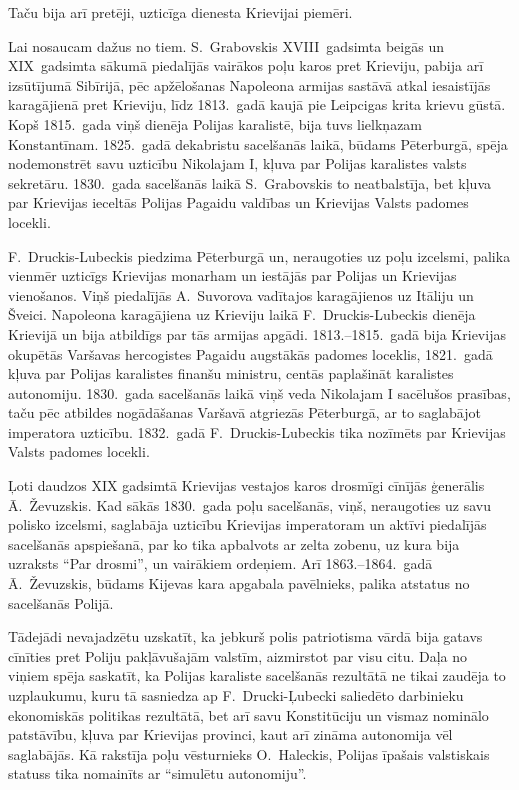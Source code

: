 \documentclass[twoside,a5paper,12pt,fleqn,openany]{extbook}
\begin{document}
Taču bija arī pretēji, uzticīga dienesta Krievijai piemēri.

Lai nosaucam dažus no tiem. S.~Grabovskis XVIII~gadsimta beigās un XIX~gadsimta sākumā piedalījās vairākos poļu karos pret Krieviju, pabija arī izsūtījumā Sibīrijā, pēc apžēlošanas Napoleona armijas sastāvā atkal iesaistījās karagājienā pret Krieviju, līdz 1813.~gadā kaujā pie Leipcigas krita krievu gūstā. Kopš 1815.~gada viņš dienēja Polijas karalistē, bija tuvs lielkņazam Konstantīnam. 1825.~gadā dekabristu sacelšanās laikā, būdams Pēterburgā, spēja nodemonstrēt savu uzticību Nikolajam I, kļuva par Polijas karalistes valsts sekretāru. 1830.~gada sacelšanās laikā S.~Grabovskis to neatbalstīja, bet kļuva par Krievijas ieceltās Polijas Pagaidu valdības un Krievijas Valsts padomes locekli.

F.~Druckis-Lubeckis piedzima Pēterburgā un, neraugoties uz poļu izcelsmi, palika vienmēr uzticīgs Krievijas monarham un iestājās par Polijas un Krievijas vienošanos. Viņš piedalījās A.~Suvorova vadītajos karagājienos uz Itāliju un Šveici. Napoleona karagājiena uz Krieviju laikā F.~Druckis-Lubeckis dienēja Krievijā un bija atbildīgs par tās armijas apgādi. 1813.--1815.~gadā bija Krievijas okupētās Varšavas hercogistes Pagaidu augstākās padomes loceklis, 1821.~gadā kļuva par Polijas karalistes finanšu ministru, centās paplašināt karalistes autonomiju. 1830.~gada sacelšanās laikā viņš veda Nikolajam I sacēlušos prasības, taču pēc atbildes nogādāšanas Varšavā atgriezās Pēterburgā, ar to saglabājot imperatora uzticību. 1832.~gadā F.~Druckis-Lubeckis tika nozīmēts par Krievijas Valsts padomes locekli.

Ļoti daudzos XIX gadsimtā Krievijas vestajos karos drosmīgi cīnījās ģenerālis Ā.~Ževuzskis. Kad sākās 1830.~gada poļu sacelšanās, viņš, neraugoties uz savu polisko izcelsmi, saglabāja uzticību Krievijas imperatoram un aktīvi piedalījās sacelšanās apspiešanā, par ko tika apbalvots ar zelta zobenu, uz kura bija uzraksts ``Par drosmi'', un vairākiem ordeņiem. Arī 1863.--1864.~gadā Ā.~Ževuzskis, būdams Kijevas kara apgabala pavēlnieks, palika atstatus no sacelšanās Polijā.

Tādejādi nevajadzētu uzskatīt, ka jebkurš polis patriotisma vārdā bija gatavs cīnīties pret Poliju pakļāvušajām valstīm, aizmirstot par visu citu. Daļa no viņiem spēja saskatīt, ka Polijas karaliste sacelšanās rezultātā ne tikai zaudēja to uzplaukumu, kuru tā sasniedza ap F.~Drucki-Ļubecki saliedēto darbinieku ekonomiskās politikas rezultātā, bet arī savu Konstitūciju un vismaz nominālo patstāvību, kļuva par Krievijas provinci, kaut arī zināma autonomija vēl saglabājās. Kā rakstīja poļu vēsturnieks O.~Haleckis, Polijas īpašais valstiskais statuss tika nomainīts ar ``simulētu autonomiju''.
\end{document}
